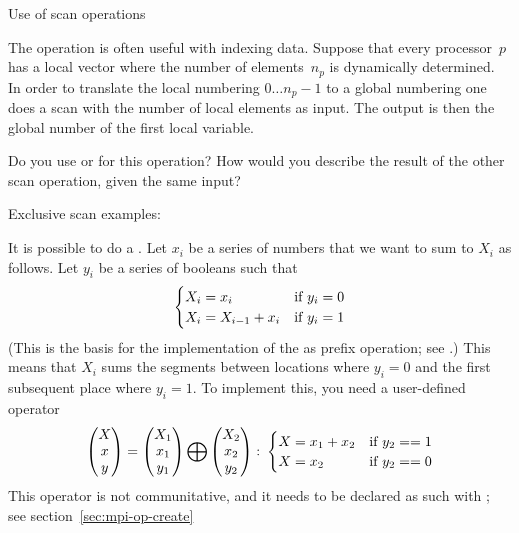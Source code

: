  {Use of scan operations}

The  operation is often useful with indexing data. Suppose that
every processor~$p$ has a local vector where the number of elements~$n_p$ is dynamically 
determined. In order to translate the local numbering $0\ldots n_p-1$ to a global numbering
one does a scan with the number of local elements as input. The output is then the global 
number of the first local variable.

\begin{exercise}
  Do you use  or  for this operation? How
  would you describe the result of the other scan operation, given the
  same input?
\end{exercise}

Exclusive scan examples:
%
%

It is possible to do a . Let $x_i$ be a series of numbers
that we want to sum to $X_i$ as follows. Let $y_i$ be a series of booleans such that
\[ 
\begin{cases}
  X_i=x_i&\hbox{if $y_i=0$}\\
  X_i=X_{i-1}+x_i&\hbox{if $y_i=1$}
\end{cases}
\]
(This is the basis for the implementation of the 
as prefix operation; see .)
This means that $X_i$ sums the segments between locations where $y_i=0$ and the
first subsequent place where $y_i=1$. To implement this, you need a user-defined operator
\[ 
\begin{pmatrix}  X\\ x\\ y\end{pmatrix}
=
\begin{pmatrix}  X_1\\ x_1\\ y_1\end{pmatrix}
\bigoplus
\begin{pmatrix}  X_2\\ x_2\\ y_2\end{pmatrix}\colon
  \begin{cases}
    X=x_1+x_2&\hbox{if $y_2==1$}\\ X=x_2&\hbox{if $y_2==0$}
  \end{cases}
\]
This operator is not communitative, and it needs to be declared as such
with ; see section~\ref{sec:mpi-op-create}


